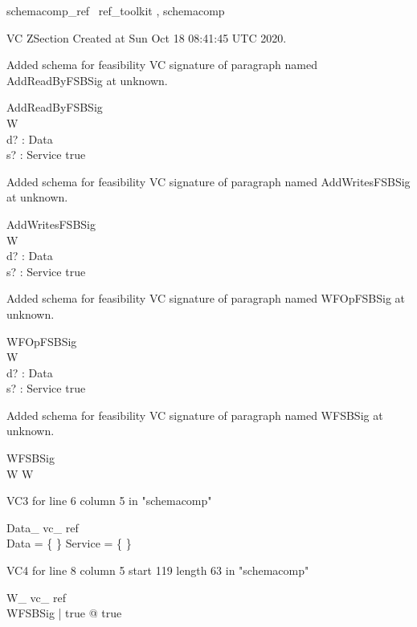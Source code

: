 \documentclass{article}
\begin{document}

\begin{zsection}	 \SECTION schemacomp\_ref \parents~ref\_toolkit , schemacomp
\end{zsection}

VC ZSection Created at Sun Oct 18 08:41:45 UTC 2020.


Added schema for feasibility VC signature of paragraph named AddReadByFSBSig at unknown.
\begin{schema}{AddReadByFSBSig}
\\
 W \\
 d? : Data \\
 s? : Service 
\where
 true
\end{schema}


Added schema for feasibility VC signature of paragraph named AddWritesFSBSig at unknown.
\begin{schema}{AddWritesFSBSig}
\\
 W \\
 d? : Data \\
 s? : Service 
\where
 true
\end{schema}


Added schema for feasibility VC signature of paragraph named WFOpFSBSig at unknown.
\begin{schema}{WFOpFSBSig}
\\
 W \\
 d? : Data \\
 s? : Service 
\where
 true
\end{schema}


Added schema for feasibility VC signature of paragraph named WFSBSig at unknown.
\begin{schema}{WFSBSig}
\\
 W 
\where
 W
\end{schema}

VC3 for line 6 column 5 in "schemacomp"
\begin{theorem}{ Data\_ vc\_ ref}\\
 \lnot Data = \{ \} \land \lnot Service = \{ \} \\

\end{theorem}

VC4 for line 8 column 5 start 119 length 63 in "schemacomp"
\begin{theorem}{ W\_ vc\_ ref}\\
 \exists WFSBSig | true @ true \\

\end{theorem}
\end{document}
